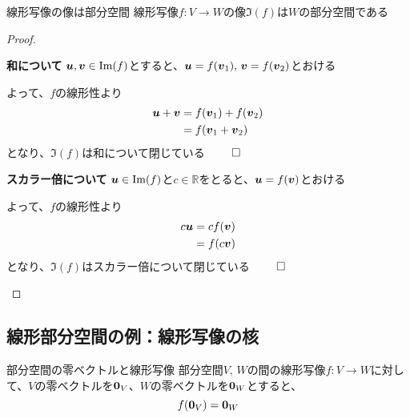 \documentclass[../../../topic_linear-algebra]{subfiles}
\begin{document}
\begin{theorem}{線形写像の像は部分空間}
  線形写像$f\colon V \to W$の像$\Im(f)$は$W$の部分空間である
\end{theorem}

\begin{proof}
  \begin{subpattern}{\bfseries 和について}
    $\vb*{u}, \vb*{v} \in \Im(f)$とすると、$\vb*{u} = f(\vb*{v}_1),\, \vb*{v} = f(\vb*{v}_2)$とおける

    よって、$f$の線形性より
    \begin{align*}
      \vb*{u} + \vb*{v} & = f(\vb*{v}_1) + f(\vb*{v}_2) \\
                        & = f(\vb*{v}_1 + \vb*{v}_2)
    \end{align*}
    となり、$\Im(f)$は和について閉じている $\qed$
  \end{subpattern}

  \begin{subpattern}{\bfseries スカラー倍について}
    $\vb*{u} \in \Im(f)$と$c \in \mathbb{R}$をとると、$\vb*{u} = f(\vb*{v})$とおける

    よって、$f$の線形性より
    \begin{align*}
      c \vb*{u} & = c f(\vb*{v}) \\
                & = f(c \vb*{v})
    \end{align*}
    となり、$\Im(f)$はスカラー倍について閉じている $\qed$
  \end{subpattern}
\end{proof}

\subsection{線形部分空間の例：線形写像の核}

\begin{theorem}{部分空間の零ベクトルと線形写像}\label{thm:linear-map-zero-preserving}
  部分空間$V,\,W$の間の線形写像$f\colon V \to W$に対して、$V$の零ベクトルを$\vb*{0}_V$、$W$の零ベクトルを$\vb*{0}_W$とすると、
  \begin{equation*}
    f(\vb*{0}_V) = \vb*{0}_W
  \end{equation*}
\end{theorem}
\end{document}
